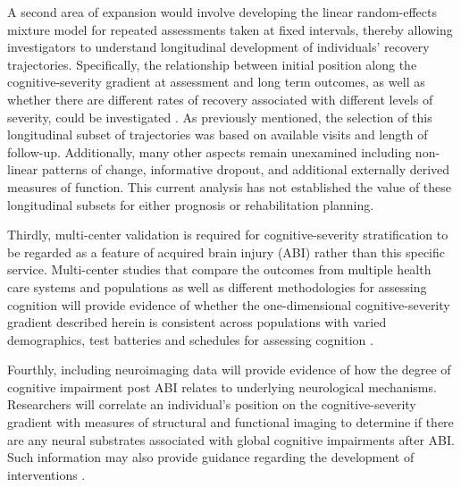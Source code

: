 A second area of expansion would involve developing the linear random-effects mixture model for repeated assessments taken at fixed intervals, thereby allowing investigators to understand longitudinal development of individuals' recovery trajectories. Specifically, the relationship between initial position along the cognitive-severity gradient at assessment and long term outcomes, as well as whether there are different rates of recovery associated with different levels of severity, could be investigated \parencite{ponsford2014longitudinal}. As previously mentioned, the selection of this longitudinal subset of trajectories was based on available visits and length of follow-up. Additionally, many other aspects remain unexamined including non-linear patterns of change, informative dropout, and additional externally derived measures of function. This current analysis has not established the value of these longitudinal subsets for either prognosis or rehabilitation planning.

Thirdly, multi-center validation is required for cognitive-severity stratification to be regarded as a feature of acquired brain injury (ABI) rather than this specific service. Multi-center studies that compare the outcomes from multiple health care systems and populations as well as different methodologies for assessing cognition will provide evidence of whether the one-dimensional cognitive-severity gradient described herein is consistent across populations with varied demographics, test batteries and schedules for assessing cognition \parencite{maas2017traumatic}.

Fourthly, including neuroimaging data will provide evidence of how the degree of cognitive impairment post ABI relates to underlying neurological mechanisms. Researchers will correlate an individual's position on the cognitive-severity gradient with measures of structural and functional imaging to determine if there are any neural substrates associated with global cognitive impairments after ABI. Such information may also provide guidance regarding the development of interventions \parencite{saatman2008classification,maas2017traumatic}.
